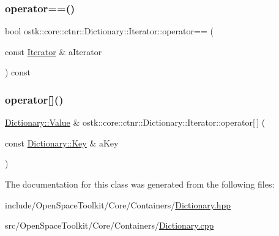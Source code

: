 \subsubsection{\texorpdfstring{operator==()}{operator==()}}
{\footnotesize\ttfamily bool ostk\+::core\+::ctnr\+::\+Dictionary\+::\+Iterator\+::operator== (\begin{DoxyParamCaption}\item[{const \hyperlink{classostk_1_1core_1_1ctnr_1_1_dictionary_1_1_iterator}{Iterator} \&}]{a\+Iterator }\end{DoxyParamCaption}) const}

\mbox{\label{classostk_1_1core_1_1ctnr_1_1_dictionary_1_1_iterator_a9bd8822700f2d7faf1a9aa5df834ebcf}} 
\subsubsection{\texorpdfstring{operator[]()}{operator[]()}}
{\footnotesize\ttfamily \hyperlink{classostk_1_1core_1_1ctnr_1_1_dictionary_ace6ab82268031e972455affca8730c9c}{Dictionary\+::\+Value} \& ostk\+::core\+::ctnr\+::\+Dictionary\+::\+Iterator\+::operator\mbox{[}$\,$\mbox{]} (\begin{DoxyParamCaption}\item[{const \hyperlink{classostk_1_1core_1_1ctnr_1_1_dictionary_aa3b171525039535f342d271d27f90407}{Dictionary\+::\+Key} \&}]{a\+Key }\end{DoxyParamCaption})}



The documentation for this class was generated from the following files\+:\begin{DoxyCompactItemize}
\item 
include/\+Open\+Space\+Toolkit/\+Core/\+Containers/\hyperlink{_dictionary_8hpp}{Dictionary.\+hpp}\item 
src/\+Open\+Space\+Toolkit/\+Core/\+Containers/\hyperlink{_dictionary_8cpp}{Dictionary.\+cpp}\end{DoxyCompactItemize}
